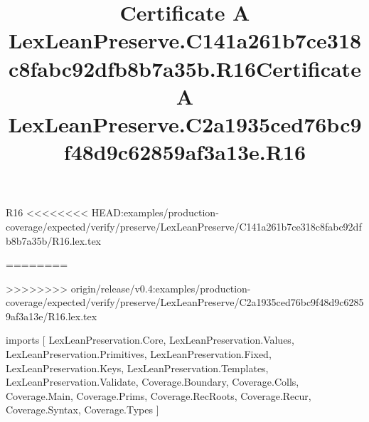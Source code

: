 \begin{lexlean}{R16}
<<<<<<<< HEAD:examples/production-coverage/expected/verify/preserve/LexLeanPreserve/C141a261b7ce318c8fabc92dfb8b7a35b/R16.lex.tex
\title{Certificate A LexLeanPreserve.C141a261b7ce318c8fabc92dfb8b7a35b.R16}
========
\title{Certificate A LexLeanPreserve.C2a1935ced76bc9f48d9c62859af3a13e.R16}
>>>>>>>> origin/release/v0.4:examples/production-coverage/expected/verify/preserve/LexLeanPreserve/C2a1935ced76bc9f48d9c62859af3a13e/R16.lex.tex
\begin{coremodule}
imports [
  LexLeanPreservation.Core,
  LexLeanPreservation.Values,
  LexLeanPreservation.Primitives,
  LexLeanPreservation.Fixed,
  LexLeanPreservation.Keys,
  LexLeanPreservation.Templates,
  LexLeanPreservation.Validate,
  Coverage.Boundary,
  Coverage.Colls,
  Coverage.Main,
  Coverage.Prims,
  Coverage.RecRoots,
  Coverage.Recur,
  Coverage.Syntax,
  Coverage.Types
]


\end{coremodule}
\end{lexlean}
